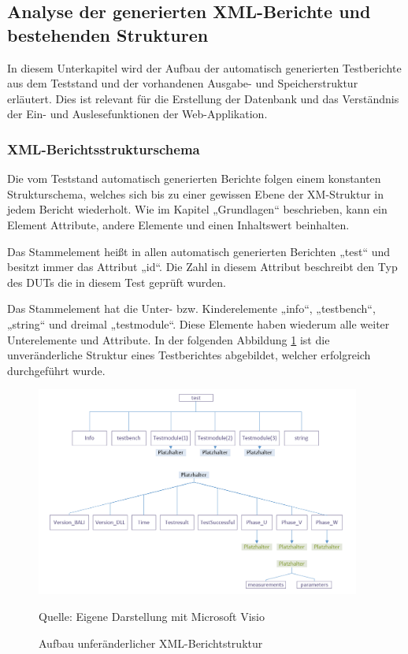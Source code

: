 \subsection{Analyse der generierten XML-Berichte und bestehenden Strukturen}
\label{subsec:analyse-der-generierten-xml-berichte-und-bestehenden-strukturen}

In diesem Unterkapitel wird der Aufbau der automatisch
generierten Testberichte aus dem Teststand und der vorhandenen Ausgabe- und Speicherstruktur
erläutert. Dies ist relevant für die Erstellung der Datenbank und das
Verständnis der Ein- und Auslesefunktionen der Web-Applikation.

\subsubsection{XML-Berichtsstrukturschema}

Die vom Teststand automatisch generierten
Berichte folgen einem konstanten Strukturschema, welches sich bis zu einer
gewissen Ebene der XM-Struktur in jedem Bericht wiederholt. Wie im Kapitel „Grundlagen“
beschrieben, kann ein Element Attribute, andere Elemente und einen Inhaltswert beinhalten.

Das Stammelement heißt in allen automatisch
generierten Berichten „test“ und besitzt immer das Attribut „id“. Die Zahl in
diesem Attribut beschreibt den Typ des \ac{DUTs} die in diesem Test geprüft wurden.

Das Stammelement hat die Unter- bzw.
Kinderelemente „info“, „testbench“, „string“ und dreimal „testmodule“.
Diese Elemente haben wiederum alle weiter Unterelemente und Attribute.
In der folgenden Abbildung \ref{fig: Aufbau unferänderlicher XML-Berichtstruktur} ist die unveränderliche Struktur eines Testberichtes abgebildet, welcher erfolgreich durchgeführt wurde.

\begin{figure}[H]
    \centering
    \includegraphics[width=0.95\textwidth]{Grafiken/XML-Strukturdiagramm}
    \caption{Aufbau unferänderlicher XML-Berichtstruktur}
    \label{fig: Aufbau unferänderlicher XML-Berichtstruktur}
    {Quelle: Eigene Darstellung mit Microsoft Visio}
\end{figure}


